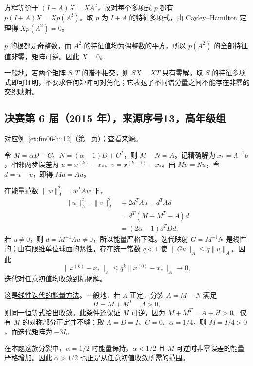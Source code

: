 \documentclass[12pt,fontset=fandol]{ctexart}
\begin{document}
\begin{solve}

方程等价于 $(I+A)X=XA^2$，故对每个多项式 $p$ 都有 $p(I+A)X=Xp(A^2)$。取 $p$ 为 $I+A$ 的特征多项式，由 Cayley--Hamilton 定理得 $Xp(A^2)=0$。

$p$ 的根都是奇整数，而 $A^2$ 的特征值均为偶整数的平方，所以 $p(A^2)$ 的全部特征值非零，矩阵可逆。因此 $X=0$。

\end{solve}

\begin{remark}[方法与条件]

一般地，若两个矩阵 $S,T$ 的谱不相交，则 $SX=XT$ 只有零解。取 $S$ 的特征多项式即可证明，不要求任何矩阵可对角化；它表达了不同谱分量之间不能存在非零的交织映射。

\end{remark}

\subsection{决赛第 6 届（2015 年），来源序号13，高年级组}\label{ans:fin06-hi:12}\label{pr:fin06-hi:12}

对应例~\ref{ex:fin06-hi:12}（第~\pageref{ex:fin06-hi:12} 页）；\href{https://github.com/lzxcr/cmc-mathematics/blob/64916fa1fdbc3e444a652eca204d5669058ee321/src/problems/finals/06/13.md}{查看来源}。

\begin{solve}

令 $M=\alpha D-C$、$N=(\alpha-1)D+C^T$，则 $M-N=A$。记精确解为 $x_*=A^{-1}b$，相邻两步误差为 $u=x^{(k)}-x_*$、$v=x^{(k+1)}-x_*$。由 $Mv=Nu$，令 $d=u-v$，即得 $Md=Au$。

在能量范数 $\|w\|_A^2=w^TAw$ 下，
\[
\begin{aligned}
\|u\|_A^2-\|v\|_A^2
&=2d^TAu-d^TAd\\
&=d^T(M+M^T-A)d\\
&=(2\alpha-1)d^TDd.
\end{aligned}
\]
若 $u\ne0$，则 $d=M^{-1}Au\ne0$，所以能量严格下降。迭代映射 $G=M^{-1}N$ 是线性的；由有限维单位球面的紧性，存在统一常数 $q<1$ 使 $\|Gu\|_A\le q\|u\|_A$。因此
\[
\|x^{(k)}-x_*\|_A\le q^k\|x^{(0)}-x_*\|_A\longrightarrow0,
\]
迭代对任意初值均收敛到精确解。

\end{solve}

\begin{remark}[方法与条件]

这是\hyperref[app:linear-iteration]{线性迭代的能量方法}。一般地，若 $A$ 正定，分裂 $A=M-N$ 满足
\[
H=M+M^T-A>0,
\]
则同一恒等式给出收敛。此条件还保证 $M$ 可逆，因为 $M+M^T=A+H>0$。仅有 $M$ 的对称部分正定并不够：取 $A=D=I$、$C=0$、$\alpha=1/4$，则 $M=I/4>0$，而迭代矩阵为 $-3I$。

在本题这族分裂中，$\alpha=1/2$ 时能量保持，$\alpha<1/2$ 且 $M$ 可逆时非零误差的能量严格增加。因此 $\alpha>1/2$ 也正是从任意初值收敛所需的范围。

\end{remark}
\end{document}
